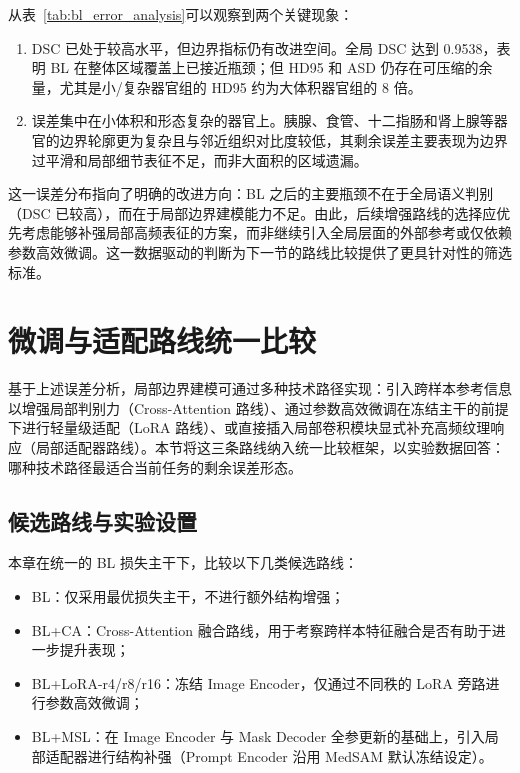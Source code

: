 从表~\ref{tab:bl_error_analysis}可以观察到两个关键现象：

\begin{enumerate}
  \item DSC 已处于较高水平，但边界指标仍有改进空间。全局 DSC 达到 0.9538，表明 BL 在整体区域覆盖上已接近瓶颈；但 HD95 和 ASD 仍存在可压缩的余量，尤其是小/复杂器官组的 HD95 约为大体积器官组的 8 倍。
  \item 误差集中在小体积和形态复杂的器官上。胰腺、食管、十二指肠和肾上腺等器官的边界轮廓更为复杂且与邻近组织对比度较低，其剩余误差主要表现为边界过平滑和局部细节表征不足，而非大面积的区域遗漏。
\end{enumerate}

这一误差分布指向了明确的改进方向：BL 之后的主要瓶颈不在于全局语义判别（DSC 已较高），而在于局部边界建模能力不足。由此，后续增强路线的选择应优先考虑能够补强局部高频表征的方案，而非继续引入全局层面的外部参考或仅依赖参数高效微调。这一数据驱动的判断为下一节的路线比较提供了更具针对性的筛选标准。

\section{微调与适配路线统一比较}

基于上述误差分析，局部边界建模可通过多种技术路径实现：引入跨样本参考信息以增强局部判别力（Cross-Attention 路线）、通过参数高效微调在冻结主干的前提下进行轻量级适配（LoRA 路线）、或直接插入局部卷积模块显式补充高频纹理响应（局部适配器路线）。本节将这三条路线纳入统一比较框架，以实验数据回答：哪种技术路径最适合当前任务的剩余误差形态。

\subsection{候选路线与实验设置}

本章在统一的 BL 损失主干下，比较以下几类候选路线：
\begin{itemize}
  \item BL：仅采用最优损失主干，不进行额外结构增强；
  \item BL+CA：Cross-Attention 融合路线，用于考察跨样本特征融合是否有助于进一步提升表现；
  \item BL+LoRA-r4/r8/r16：冻结 Image Encoder，仅通过不同秩的 LoRA 旁路进行参数高效微调；
  \item BL+MSL：在 Image Encoder 与 Mask Decoder 全参更新的基础上，引入局部适配器进行结构补强（Prompt Encoder 沿用 MedSAM 默认冻结设定）。
\end{itemize}

